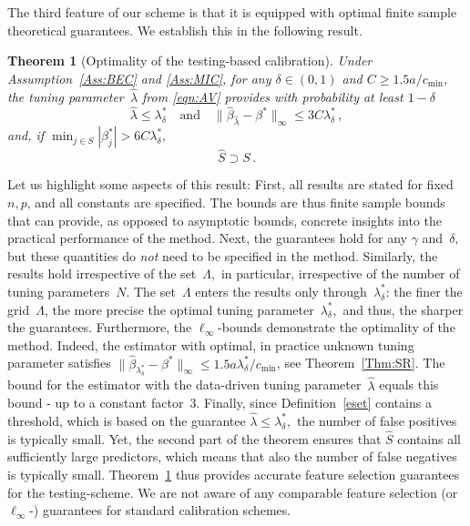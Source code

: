 \documentclass{elsarticle}
\newtheorem{theorem}{Theorem}
\newcommand\norm[1]{\lVert#1\rVert}
\newcommand{\truepara}{{\beta^*}}
\newcommand{\trueparaj}{{\beta^*_j}}
\newcommand{\estipara}{{\hat{\beta}}}
\newcommand{\tuning}{{\lambda}}
\newcommand{\ratio}{a}
\newcommand{\constA}{C}
\begin{document}
The third feature of our scheme is that it is equipped with optimal finite sample theoretical guarantees. We establish this in the following result.
   \begin{theorem}[Optimality of the testing-based calibration]
   \label{Thm:AV}
     Under Assumption~\ref{Ass:BEC} and \ref{Ass:MIC}, for any $\delta\in (0,1)$ and $\constA\geq 1.5 \ratio/c_{\min}$, the tuning parameter~$\hat{\tuning}$ from  \eqref{eqn:AV} provides with probability at least $1-\delta$
 \[\hat{\tuning}\leq \tuning_{\delta}^* \quad \text{and} \quad
 \norm{\estipara_{\hat{\tuning}}-\truepara}_{\infty}\leq 3\constA\tuning_{\delta}^*\,,
\]
and, if $\min_{j \in S}|\trueparaj|>6\constA\tuning_{\delta}^*,$
     \begin{equation*}
       \hat S \supset S\,.
     \end{equation*}
   \end{theorem}
\noindent Let us highlight some aspects of this result: First, all results are stated for fixed $n,p$, and all constants are specified. The bounds are thus finite sample bounds that can provide, as opposed to asymptotic bounds, concrete insights into the practical performance of the method.  Next, the guarantees hold for any $\gamma$ and~$\delta,$  but these quantities do  {\it not} need to be specified in the method. Similarly, the results hold irrespective of the set~$\Lambda,$ in particular, irrespective of the number of tuning parameters~$N$. The set~$\Lambda$ enters the results only  through~$\tuning_{\delta}^*$: the finer the grid~$\Lambda$, the more precise the optimal tuning parameter~$\tuning_{\delta}^*, $ and thus, the sharper the guarantees. Furthermore, the $\ell_\infty$-bounds demonstrate the optimality of the method. Indeed,  the estimator with optimal, in practice unknown tuning parameter satisfies $\norm{\estipara_{\tuning_{\delta}^*}-\truepara}_{\infty}\leq 1.5\ratio\tuning_{\delta}^*/c_{\min}$, see Theorem~\ref{Thm:SR}. The bound for the estimator with the data-driven tuning parameter~$\hat\tuning$ equals this bound - up to a constant factor~3. Finally, since Definition~\eqref{eset} contains a threshold, which is based on the guarantee $\hat{\tuning}\leq \tuning_{\delta}^*,$  the number of false positives is typically small. Yet, the second part of the theorem ensures that $\hat S$ contains all sufficiently large predictors, which means that also the number of false negatives is typically small.  Theorem~\ref{Thm:AV} thus provides accurate feature selection guarantees for the testing-scheme.  We are not aware of any comparable feature selection (or $\ell_\infty$-) guarantees for standard calibration schemes.
\end{document}
